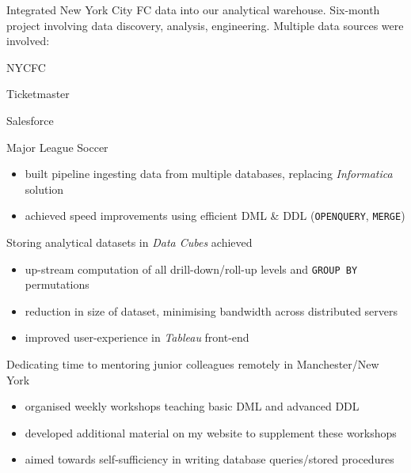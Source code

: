 \documentclass[letterpaper,11pt]{article}
\begin{document}
\begin{description}[style=multiline,leftmargin=3cm]
	\item[NYCFC Data Integration \textnormal{Project Owner}]

	      Integrated New York City FC  data into our analytical warehouse.
	      Six-month project involving data discovery, analysis, engineering.
	      Multiple data sources were involved:
	      \begin{itemize*}
		      \item NYCFC
		      \item Ticketmaster
		      \item Salesforce
		      \item Major League Soccer
	      \end{itemize*}
	      \begin{description}[style=multiline,leftmargin=2.5cm]
		      \item[Data Pipeline]
		            {
		            \begin{itemize}
			            \item built pipeline ingesting data from multiple databases, replacing \textit{Informatica} solution
			            \item achieved speed improvements using efficient DML \& DDL (\texttt{OPENQUERY}, \texttt{MERGE})
		            \end{itemize}
		            }

		      \item[Data Cubes]
		            Storing analytical datasets in \textit{Data Cubes} achieved
		            \begin{itemize}
			            \item up-stream computation of all drill-down/roll-up levels and \texttt{GROUP BY} permutations
			            \item reduction in size of dataset, minimising bandwidth across distributed servers
			            \item improved user-experience in \textit{Tableau} front-end
		            \end{itemize}

		      \item[Mentoring]
		            Dedicating time to mentoring junior colleagues remotely in Manchester/New York
		            \begin{itemize}
			            \item organised weekly workshops teaching basic DML and advanced DDL
			            \item developed additional material on my website to supplement these workshops
			            \item aimed towards self-sufficiency in writing database queries/stored procedures
		            \end{itemize}


\end{description}
\end{description}
\end{document}

